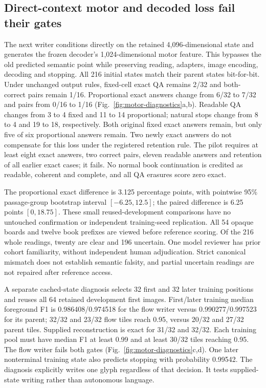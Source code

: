 \documentclass[12pt,a4paper]{article}
\providecommand{\DIFadd}[1]{{\protect\color{blue} \sf #1}} %
\begin{document}
\subsection*{\DIFadd{Direct-context motor and decoded loss fail their gates}}
\DIFadd{The next writer conditions directly on the retained 4,096-dimensional state
and generates the frozen decoder's 1,024-dimensional motor feature. This
bypasses the old predicted semantic point while preserving reading, adapters,
image encoding, decoding and stopping. All 216 initial states match their
parent states bit-for-bit. Under unchanged output rules, fixed-cell exact QA
remains 2/32 and both-correct pairs remain 1/16. Proportional exact answers
change from 6/32 to 7/32 and pairs from 0/16 to 1/16
(Fig.~\ref{fig:motor-diagnostics}a,b). Readable QA changes from 3 to 4 fixed
and 11 to 14 proportional; natural stops change from 8 to 4 and 19 to 18,
respectively. Both original fixed exact answers remain, but only five of six
proportional answers remain. Two newly exact answers do not compensate for
this loss under the registered retention rule. The pilot requires at least
eight exact answers, two correct pairs, eleven readable answers and retention
of all earlier exact cases; it fails. No normal book continuation is credited
as readable, coherent and complete, and all QA erasures score zero exact.
}

\DIFadd{The proportional exact difference is 3.125 percentage points, with pointwise
95\% passage-group bootstrap interval $[-6.25,12.5]$; the paired difference is
6.25 points $[0,18.75]$. These small reused-development comparisons have no
untouched confirmation or independent training-seed replication. All 54 opaque
boards and twelve book prefixes are viewed before reference scoring. Of the
216 whole readings, twenty are clear and 196 uncertain. One model reviewer
has prior cohort familiarity, without independent human adjudication. Strict
canonical mismatch does not establish semantic falsity, and partial uncertain
readings are not repaired after reference access.
}

\DIFadd{A separate cached-state diagnosis selects 32 first and 32 later training
positions and reuses all 64 retained development first images. First/later
training median foreground F1 is 0.986408/0.974518 for the flow writer versus
0.990277/0.997523 for its parent; 32/32 and 23/32 flow tiles reach 0.95,
versus 20/32 and 27/32 parent tiles. Supplied reconstruction is exact for
31/32 and 32/32. Each training pool must have median F1 at least 0.99 and at
least 30/32 tiles reaching 0.95. The flow writer fails both gates
(Fig.~\ref{fig:motor-diagnostics}c,d). One later nonterminal training state
also predicts stopping with probability 0.99542. The diagnosis explicitly
writes one glyph regardless of that decision. It tests supplied-state
writing rather than autonomous language.
}
\end{document}
